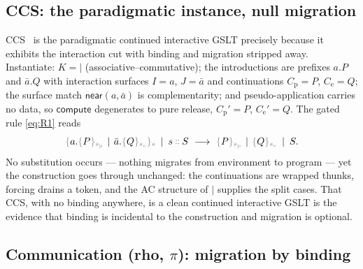 \documentclass[11pt]{article}
\theoremstyle{definition}
\theoremstyle{plain}
\newcommand{\dec}[1]{\textcolor{costgray}{#1}}   %
\newcommand{\near}{\mathsf{near}}
\newcommand{\sgn}[2]{\dec{\{}{#1}\dec{\}_{#2}}}  %
\newcommand{\cons}{\mathbin{\dec{\dblcolon}}}  %
\newcommand{\red}{\longrightarrow}
\newcommand{\compute}{\mathsf{compute}}
\newcommand{\Par}{\mathbin{|}}
\begin{document}
\subsection{CCS: the paradigmatic instance, null migration}

CCS~\cite{MilnerCCS1980} is the paradigmatic continued interactive GSLT
precisely because it exhibits the interaction cut with binding and
migration stripped away. Instantiate: $K = {\Par}$
(associative--commutative); the introductions are prefixes $a.P$ and
$\bar a.Q$ with interaction surfaces $I = a$, $J = \bar a$ and
continuations $C_{\mathrm p} = P$, $C_{\mathrm e} = Q$; the surface match
$\near(a,\bar a)$ is complementarity; and pseudo-application carries no
data, so $\compute$ degenerates to pure release, $C_{\mathrm p}' = P$,
$C_{\mathrm e}' = Q$. The gated rule \eqref{eq:R1} reads
%
\[
  \sgn{a.\sgn{P}{s_{\mathrm p}} \,\Par\, \bar a.\sgn{Q}{s_{\mathrm e}}}{s}
  \;\Par\; s\cons S
  \ \red\
  \sgn{P}{s_{\mathrm p}} \,\Par\, \sgn{Q}{s_{\mathrm e}} \;\Par\; S.
\]
%
No substitution occurs --- nothing migrates from environment to program ---
yet the construction goes through unchanged: the continuations are
wrapped thunks, forcing drains a token, and the AC structure of $\Par$
supplies the split cases. That CCS, with no binding anywhere, is a clean
continued interactive GSLT is the evidence that binding is incidental to
the construction and migration is optional.

\subsection{Communication (rho, $\pi$): migration by binding}
\end{document}
